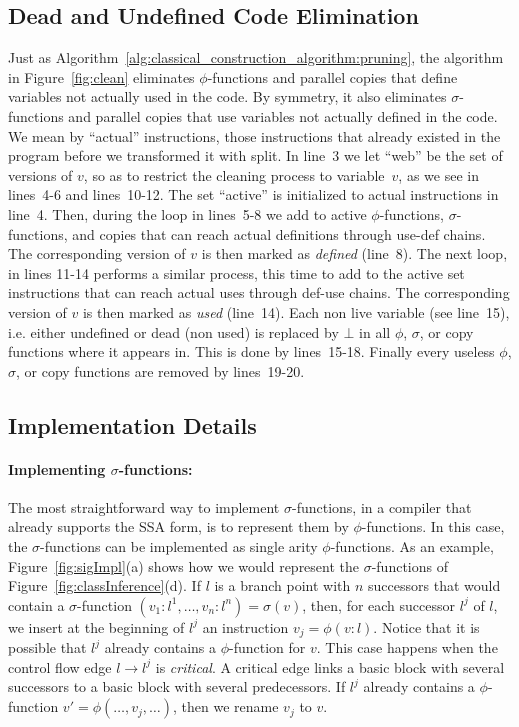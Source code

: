 \subsection{Dead and Undefined Code Elimination}

Just as Algorithm~\ref{alg:classical_construction_algorithm:pruning}, the algorithm in Figure~\ref{fig:clean} eliminates $\phi$-functions and parallel copies that define variables not actually used in the code. By symmetry, it also eliminates $\sigma$-functions  and parallel copies  that use variables not actually defined in the code.
We mean by ``actual'' instructions, those instructions that already existed in the program before we transformed it with {\sf split}.
In line~3 we let ``web'' be the set of versions of $v$, so as to restrict the cleaning process to variable~$v$, as we see in lines~4-6 and lines~10-12.
The set ``active'' is initialized to actual instructions in line~4.
Then, during the loop in lines~5-8 we add to active $\phi$-functions, $\sigma$-functions, and copies that can reach actual definitions through use-def chains.
The corresponding version of $v$ is then marked as \emph{defined} (line~8).
The next loop, in lines 11-14 performs a similar process, this time to add to the active set instructions that can reach actual uses through def-use chains.
The corresponding version of $v$ is then marked as \emph{used} (line~14).
Each non live variable (see line~15), i.e. either undefined or dead (non used) is replaced by $\bot$ in all $\phi$, $\sigma$, or copy functions where it appears in.
This is done by lines~15-18.
Finally every useless $\phi$, $\sigma$, or copy functions are removed by lines~19-20. 

\subsection{Implementation Details}
\label{sub:special}

\paragraph{Implementing $\sigma$-functions: }
The most straightforward way to implement $\sigma$-functions, in a compiler that already supports the SSA form, is to represent them by $\phi$-functions.
In this case, the $\sigma$-functions can be implemented as single arity $\phi$-functions.
As an example, Figure~\ref{fig:sigImpl}(a) shows how we would represent the $\sigma$-functions of Figure~\ref{fig:classInference}(d). 
If $l$ is a branch point with $n$ successors that would contain a $\sigma$-function $(v_1:l^1, \ldots, v_n:l^n) =\sigma(v)$, then, for each successor $l^j$ of $l$, we insert at the beginning of $l^j$ an instruction $v_j = \phi(v:l)$.
Notice that it is possible that $l^j$ already contains a $\phi$-function for $v$.
This case happens when the control flow edge $l \rightarrow l^j$ is {\em critical}.
A critical edge links a basic block with several successors to a basic block with several predecessors.
If $l^j$ already contains a $\phi$-function $v' = \phi(\ldots, v_j, \ldots)$, then we rename $v_j$ to $v$.

